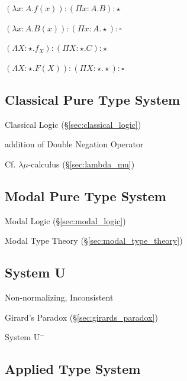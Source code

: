 $(\lambda x:A.f(x)):(\Pi x:A.B):\star$

$(\lambda x:A.B(x)):(\Pi x:A.\star):\square$

$(\Lambda X:\star.f_X):(\Pi X:\star.C):\star$

$(\Lambda X:\star.F(X)):(\Pi X:\star.\star):\square$



\subsection{Classical Pure Type System}\label{sec:cpts}

Classical Logic (\S\ref{sec:classical_logic})

addition of Double Negation Operator

\fist Cf. $\lambda\mu$-calculus (\S\ref{sec:lambda_mu})



\subsection{Modal Pure Type System}\label{sec:mpts}

Modal Logic (\S\ref{sec:modal_logic})

Modal Type Theory (\S\ref{sec:modal_type_theory})



\subsection{System U}\label{sec:system_u}

Non-normalizing, Inconsistent

Girard's Paradox (\S\ref{sec:girards_paradox})

System U$^-$



\subsection{Applied Type System}\label{sec:ats}

